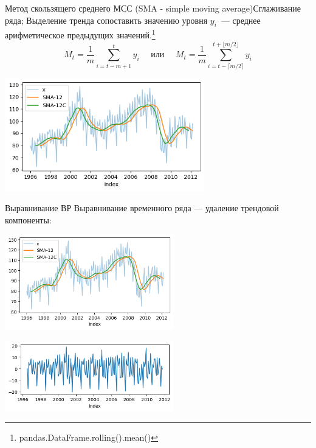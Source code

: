 \documentclass[10pt,pdf,utf8,hyperref={unicode},aspectratio=169]{beamer}
\begin{document}
\begin{frame}{Метод  скользящего среднего МСС (SMA - simple moving average)}{Сглаживание ряда; Выделение тренда}
	 сопоставить значению уровня $y_i$~--- среднее арифметическое предыдущих значений.\footnote{pandas.DataFrame.rolling().mean()}
	$$
		M_t = \frac{1}{m} \sum_{i=t-m+1}^{t} y_i 
		\quad \text{ или }\quad
		M_t = \frac{1}{m} 
		\sum_{i=t-\lceil m/2 \rceil}^{t+\lfloor m/2 \rfloor} y_i
	$$

	{
		\centering
		\includegraphics[width=0.65\textwidth]{sma12.png}
		\par
	}
\end{frame}

\begin{frame}{Выравнивание ВР }{}
	Выравнивание временного ряда  --- удаление трендовой компоненты:

	{\centering
		\includegraphics[width=0.55\textwidth]{sma12.png}
		\par
		\includegraphics[width=0.55\textwidth]{sma12_detrend.png}
		\par
	}

\end{frame}

\end{document}
